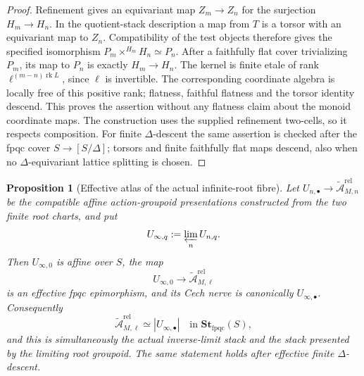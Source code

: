 \documentclass[11pt]{article}
\newtheorem{proposition}[theorem]{Proposition}
\theoremstyle{definition}
\theoremstyle{remark}
\begin{document}
\begin{proof}
Refinement gives an equivariant map $Z_m\to Z_n$ for the surjection
$H_m\to H_n$.  In the quotient-stack description a map from $T$
is a torsor with an equivariant map to $Z_n$.  Compatibility of the
test objects therefore gives the specified isomorphism
$P_m\times^{H_m}H_n\simeq P_n$.  After a faithfully flat cover
trivializing $P_m$, its map to $P_n$ is exactly $H_m\to H_n$.
The kernel is finite etale of rank $\ell^{(m-n)\operatorname{rk}L}$,
since $\ell$ is invertible.  The corresponding coordinate algebra is
locally free of this positive rank; flatness, faithful flatness and the
torsor identity descend.  This proves the assertion without any
flatness claim about the monoid coordinate maps.  The construction
uses the supplied refinement two-cells, so it respects composition.
For finite $\Delta$-descent the same assertion is checked after the
fpqc cover $S\to[S/\Delta]$; torsors and finite faithfully flat maps
descend, also when no $\Delta$-equivariant lattice splitting is chosen.
\end{proof}

\begin{proposition}[Effective atlas of the actual infinite-root fibre]
\label{prop:frag-actual-root-effective-atlas}
Let $U_{n,\bullet}\to
\widetilde{\mathcal A}_{M,n}^{\mathrm{rel}}$ be the compatible affine
action-groupoid presentations constructed from the two finite root charts,
and put
\[
 U_{\infty,q}:=\varprojlim_n U_{n,q}.
\]
Then $U_{\infty,0}$ is affine over $S$, the map
\[
 U_{\infty,0}\longrightarrow
 \widetilde{\mathcal A}_{M,\ell}^{\mathrm{rel}}
\]
is an effective fpqc epimorphism, and its Cech nerve is canonically
$U_{\infty,\bullet}$.  Consequently
\begin{equation}
 \widetilde{\mathcal A}_{M,\ell}^{\mathrm{rel}}
 \simeq |U_{\infty,\bullet}|
 \quad\text{in }\mathbf{St}_{\mathrm{fpqc}}(S),
 \label{eq:frag-actual-root-effective-presentation}
\end{equation}
and this is simultaneously the actual inverse-limit stack and the stack
presented by the limiting root groupoid.  The same statement holds after
effective finite $\Delta$-descent.
\end{proposition}
\end{document}
